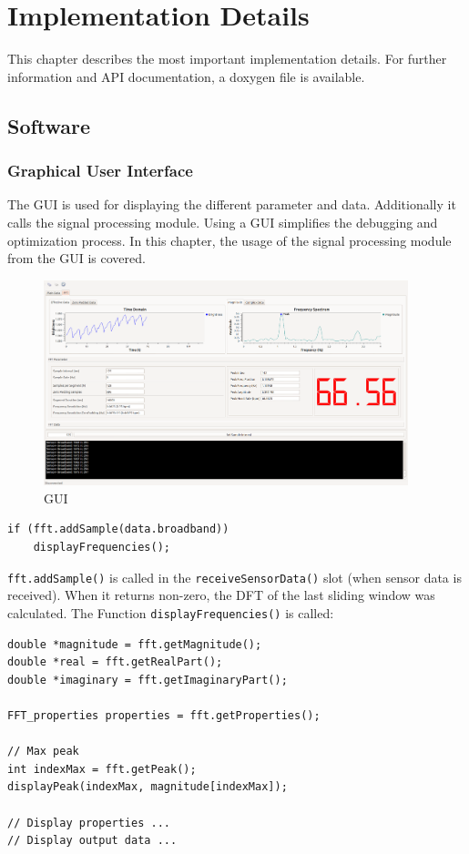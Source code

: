\documentclass[notitlepage]{scrreprt}
\begin{document}
\chapter{Implementation Details}
\label{chap:impl-details}
This chapter describes the most important implementation details. For further information and API documentation, a doxygen file is available.

\section{Software}
\subsection{Graphical User Interface}
The GUI is used for displaying the different parameter and data. Additionally it calls the signal processing module. Using a GUI simplifies the debugging and optimization process. In this chapter, the usage of the signal processing module from the GUI is covered.

\begin{figure}[H]
	\centering
	\includegraphics[width=400px]{images/screen2.png}
	\caption{GUI}
	\label{fig:gui}
\end{figure}

\begin{lstlisting}[caption=MainWindow.cpp]
if (fft.addSample(data.broadband))
	displayFrequencies();
\end{lstlisting}

\lstinline$fft.addSample()$ is called in the \lstinline$receiveSensorData()$ slot (when sensor data is received). When it returns non-zero, the DFT of the last sliding window was calculated. The Function \lstinline$displayFrequencies()$ is called:

\begin{lstlisting}[caption=MainWindow.cpp]
double *magnitude = fft.getMagnitude();
double *real = fft.getRealPart();
double *imaginary = fft.getImaginaryPart();

FFT_properties properties = fft.getProperties();

// Max peak
int indexMax = fft.getPeak();
displayPeak(indexMax, magnitude[indexMax]);

// Display properties ...
// Display output data ...
\end{lstlisting}
\end{document}
